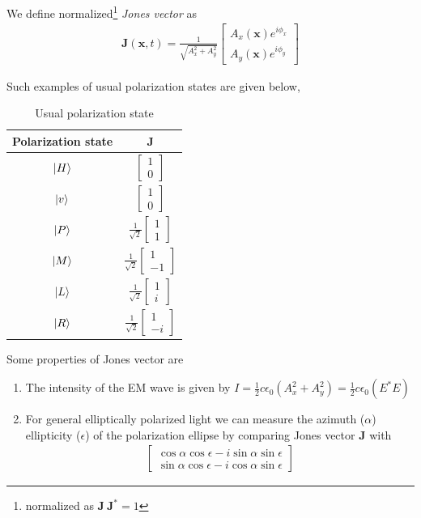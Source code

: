\documentclass[11pt,a4paper]{article}
\begin{document}
We define normalized\footnote{normalized as $\textbf{J}\:\textbf{J}^\ast=1$} \textit{Jones vector} as
\begin{align}
	\textbf{J}(\textbf{x},t)=\frac{1}{\sqrt{A_x^2+A_y^2}}
	\begin{bmatrix}
		A_x(\textbf{x})e^{i\phi_x}\\
		A_y(\textbf{x})e^{i\phi_y}
	\end{bmatrix}
\end{align}

Such examples of usual polarization states are given below,
\begin{table}[H]
	\centering
	\begin{tabular}{ c c } 
		\hline
		\hline
		Polarization state & \textbf{J}\\
		\hline
		$\ket{H}$ & $\begin{bmatrix}1\\0\end{bmatrix}$ \\ 
		$\ket{v}$ & $\begin{bmatrix}1\\0\end{bmatrix}$ \\ 
		$\ket{P}$ & $\frac{1}{\sqrt{2}}\begin{bmatrix}1\\1\end{bmatrix}$ \\
		$\ket{M}$ & $\frac{1}{\sqrt{2}}\begin{bmatrix}1\\-1\end{bmatrix}$ \\
		$\ket{L}$ & $\frac{1}{\sqrt{2}}\begin{bmatrix}1\\i\end{bmatrix}$ \\
		$\ket{R}$ & $\frac{1}{\sqrt{2}}\begin{bmatrix}1\\-i\end{bmatrix}$ \\ 
		\hline
		\hline
	\end{tabular}
	\caption{Usual polarization state}
	\label{table:1}
\end{table}

Some properties of Jones vector are
\begin{enumerate}
	\item The intensity of the EM wave is given by $I= \frac{1}{2}c\epsilon_0(A_x^2+A_y^2) = \frac{1}{2}c\epsilon_0 (E^\ast E)$
	\item For general elliptically polarized light we can measure the azimuth ($\alpha$) ellipticity ($\epsilon$) of the polarization ellipse by comparing Jones vector $\textbf{J}$ with
	\begin{align*}
		\begin{bmatrix}
			\cos\alpha\cos\epsilon- i \sin\alpha\sin\epsilon \\
			\sin\alpha\cos\epsilon- i \cos\alpha\sin\epsilon
		\end{bmatrix}
	\end{align*}
\end{enumerate}
\end{document}

